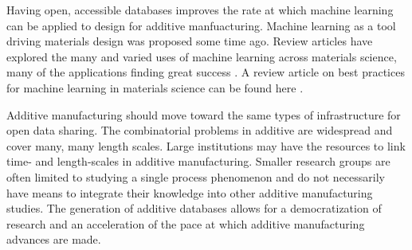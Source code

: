 Having open, accessible databases improves the rate at which machine learning can be applied to design for additive manfuacturing. Machine learning as a tool driving materials design was proposed some time ago. Review articles have explored the many and varied uses of machine learning across materials science, many of the applications finding great success \cite{Kalidindi2016, Ramprasad2017, Gubernatis2018}. A review article on best practices for machine learning in materials science can be found here \cite{Wagner2016}. 

Additive manufacturing should move toward the same types of infrastructure for open data sharing. The combinatorial problems in additive are widespread and cover many, many length scales. Large institutions may have the resources to link time- and length-scales in additive manufacturing. Smaller research groups are often limited to studying a single process phenomenon and do not necessarily have means to integrate their knowledge into other additive manufacturing studies. The generation of additive databases allows for a democratization of research and an acceleration of the pace at which additive manufacturing advances are made. 